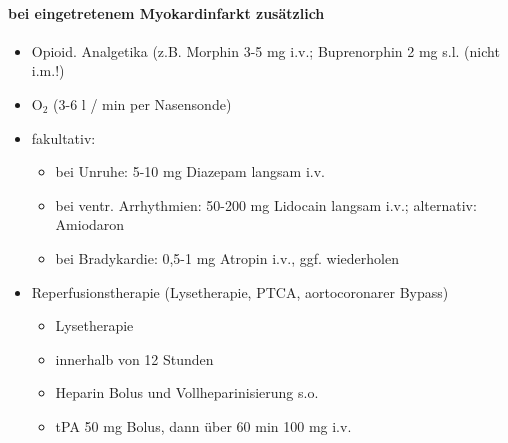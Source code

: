 \documentclass[10pt,a4paper]{report}
\begin{document}
\paragraph{bei eingetretenem Myokardinfarkt zusätzlich} %
\label{par:bei_eingetretenem_myokardinfarkt_zus_tzlich}
\begin{itemize}
	\item Opioid. Analgetika (z.B. Morphin 3-5 mg i.v.; Buprenorphin 2 mg s.l. (nicht i.m.!)
	\item O$_2$ (3-6 l / min per Nasensonde)
	\item fakultativ: 
	\begin{itemize}
		\item bei Unruhe: 5-10 mg Diazepam langsam i.v.
		\item bei ventr. Arrhythmien: 50-200 mg Lidocain langsam i.v.; alternativ: Amiodaron
	 	\item bei Bradykardie: 0,5-1 mg Atropin i.v., ggf. wiederholen
	\end{itemize}
	\item Reperfusionstherapie (Lysetherapie, PTCA, aortocoronarer Bypass)
	\begin{itemize}
		\item Lysetherapie
		\item innerhalb von 12 Stunden
		\item Heparin Bolus und Vollheparinisierung s.o.
 		\item  tPA 50 mg Bolus, dann über 60 min 100 mg i.v.
	\end{itemize}
\end{itemize}
\end{document}
